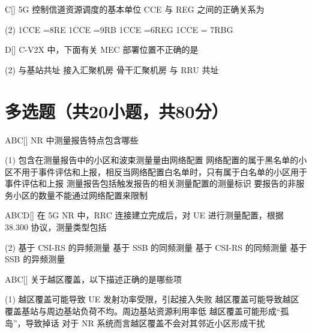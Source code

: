 \begin{choice}{C}[]
    5G 控制信道资源调度的基本单位 CCE 与 REG 之间的正确关系为
    \begin{tasks}(2)
        \task 1CCE =8RE
        \task 1CCE =9RB
        \task 1CCE =6REG
        \task 1CCE = 7RBG
    \end{tasks}
\end{choice}


\begin{choice}{D}[]
    C-V2X 中，下面有关 MEC 部署位置不正确的是
    \begin{tasks}(2)
        \task 与基站共址
        \task 接入汇聚机房
        \task 骨干汇聚机房
        \task 与 RRU 共址
    \end{tasks}
\end{choice}




\section{多选题（共20小题，共80分）}

\begin{choice}{\;ABC\;}[]
    NR 中测量报告特点包含哪些
    \begin{tasks}(1)
        \task 包含在测量报告中的小区和波束测量量由网络配置
        \task 网络配置的属于黑名单的小区不用于事件评估和上报，相反当网络配置白名单时，只有属于白名单的小区用于事件评估和上报
        \task 测量报告包括触发报告的相关测量配置的测量标识
        \task 要报告的非服务小区的数量不能通过网络配置来限制
    \end{tasks}
\end{choice}

\begin{choice}{\;ABCD\;}[]
    在 5G NR 中，RRC 连接建立完成后，对 UE 进行测量配置，根据 38.300 协议，测量类型包括
    \begin{tasks}(2)
        \task 基于 CSI-RS 的异频测量
        \task 基于 SSB 的同频测量
        \task 基于 CSI-RS 的同频测量
        \task 基于 SSB 的异频测量
    \end{tasks}
\end{choice}

\begin{choice}{\;ABC\;}[]
    关于越区覆盖，以下描述正确的是哪些项
    \begin{tasks}(1)
        \task 越区覆盖可能导致 UE 发射功率受限，引起接入失败
        \task 越区覆盖可能导致越区覆盖基站与周边基站负荷不均。周边基站资源利用率低
        \task 越区覆盖可能形成“孤岛”，导致掉话
        \task 对于 NR 系统而言越区覆盖不会对其邻近小区形成干扰
    \end{tasks}
\end{choice}

